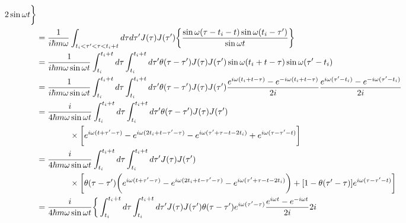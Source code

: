 \begin{subequations}
\begin{align}
{    }{2 \sin \omega t}
    \bigg\}
\notag\\&
    =
    \dfrac{1}{i \hbar m \omega}
    \int_{t_i < \tau' < \tau < t_i + t}
        d\tau d\tau'
    J(\tau) J(\tau')
    \bigg\{
    \dfrac{
        \sin \omega (\tau - t_i - t)
        \sin \omega (t_i - \tau')
    }{\sin \omega t}
    \bigg\}
\notag\\&
    =
    \dfrac{1}{i \hbar m \omega \sin \omega t}
    \int_{t_i}^{t_i + t}
        d\tau
    \int_{t_i}^{t_i + t}
        d\tau'
    \theta(\tau - \tau')
    J(\tau) J(\tau')
        \sin \omega (t_i + t - \tau)
        \sin \omega (\tau' - t_i)
\notag\\&
    =
    \dfrac{1}{i \hbar m \omega \sin \omega t}
    \int_{t_i}^{t_i + t}
        d\tau
    \int_{t_i}^{t_i + t}
        d\tau'
    \theta(\tau - \tau')
    J(\tau) J(\tau')
    \dfrac{
        e^{ i \omega (t_i + t - \tau) }
    -
        e^{ - i \omega (t_i + t - \tau) }
    }{2 i}
    \dfrac{
        e^{ i \omega (\tau' - t_i) }
    -
        e^{ - i \omega (\tau' - t_i) }
    }{2 i}
\notag\\&
    =
    \dfrac{i}{4 \hbar m \omega \sin \omega t}
    \int_{t_i}^{t_i + t}
        d\tau
    \int_{t_i}^{t_i + t}
        d\tau'
    \theta(\tau - \tau')
    J(\tau) J(\tau')
\notag\\&\qquad\qquad
    \times
    \bigg[
        e^{ i \omega (t + \tau' - \tau) }
    -
        e^{ i \omega (2 t_i + t - \tau' - \tau) }
    -
        e^{ i \omega (\tau' + \tau - t - 2 t_i) }
    +
        e^{ i \omega (\tau - \tau' - t) }
    \bigg]
\notag\\&
    =
    \dfrac{i}{4 \hbar m \omega \sin \omega t}
    \int_{t_i}^{t_i + t}
        d\tau
    \int_{t_i}^{t_i + t}
        d\tau'
    J(\tau) J(\tau')
\notag\\&\qquad\qquad
    \times
    \bigg[
    \theta(\tau - \tau')
    \bigg(
        e^{ i \omega (t + \tau' - \tau) }
    -
        e^{ i \omega (2 t_i + t - \tau' - \tau) }
    -
        e^{ i \omega (\tau' + \tau - t - 2 t_i) }
    \bigg)
    +
    [ 1 - \theta(\tau' - \tau) ]
        e^{ i \omega (\tau - \tau' - t) }
    \bigg]
\notag\\&
    =
    \dfrac{i}{4 \hbar m \omega \sin \omega t}
    \bigg\{
    \int_{t_i}^{t_i + t}
        d\tau
    \int_{t_i}^{t_i + t}
        d\tau'
    J(\tau) J(\tau')
    \theta(\tau - \tau')
        e^{ i \omega (\tau' - \tau) }
    \dfrac{
        e^{ i \omega t }
    -
        e^{ - i \omega t }
    }{2 i}
    2 i
\notag\\&\qquad\qquad

\end{align}
\end{subequations}
